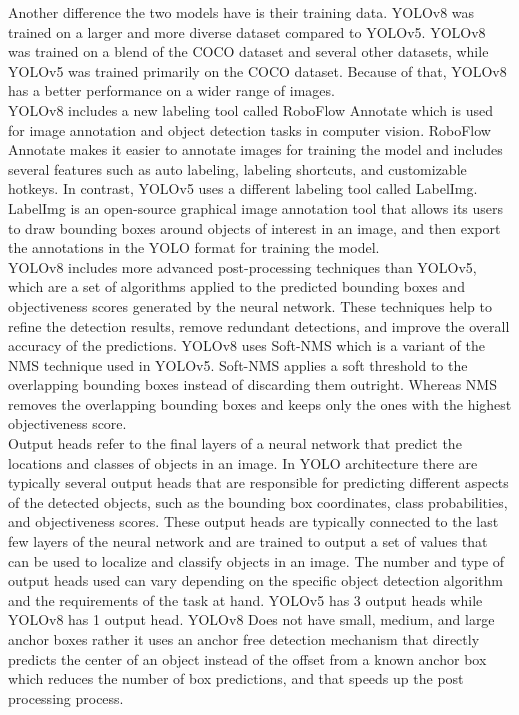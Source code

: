 \documentclass[10pt,twocolumn,letterpaper]{article}
\begin{document}
Another difference the two models have is their training data. YOLOv8 was trained on a larger and more diverse dataset compared to YOLOv5. YOLOv8 was trained on a blend of the COCO dataset and several other datasets, while YOLOv5 was trained primarily on the COCO dataset. Because of that, YOLOv8 has a better performance on a wider range of images.\\
YOLOv8 includes a new labeling tool called RoboFlow Annotate which is used for image annotation and object detection tasks in computer vision. RoboFlow Annotate makes it easier to annotate images for training the model and includes several features such as auto labeling, labeling shortcuts, and customizable hotkeys. In contrast, YOLOv5 uses a different labeling tool called LabelImg. LabelImg is an open-source graphical image annotation tool that allows its users to draw bounding boxes around objects of interest in an image, and then export the annotations in the YOLO format for training the model.\\
YOLOv8 includes more advanced post-processing techniques than YOLOv5, which are a set of algorithms applied to the predicted bounding boxes and objectiveness scores generated by the neural network. These techniques help to refine the detection results, remove redundant detections, and improve the overall accuracy of the predictions. YOLOv8 uses Soft-NMS which is a variant of the NMS technique used in YOLOv5. Soft-NMS applies a soft threshold to the overlapping bounding boxes instead of discarding them outright. Whereas NMS removes the overlapping bounding boxes and keeps only the ones with the highest objectiveness score.\\		
Output heads refer to the final layers of a neural network that predict the locations and classes of objects in an image. In YOLO architecture there are typically several output heads that are responsible for predicting different aspects of the detected objects, such as the bounding box coordinates, class probabilities, and objectiveness scores. These output heads are typically connected to the last few layers of the neural network and are trained to output a set of values that can be used to localize and classify objects in an image. The number and type of output heads used can vary depending on the specific object detection algorithm and the requirements of the task at hand. YOLOv5 has 3 output heads while YOLOv8 has 1 output head. YOLOv8 Does not have small, medium, and large anchor boxes rather it uses an anchor free detection mechanism that directly predicts the center of an object instead of the offset from a known anchor box which reduces the number of box predictions, and that speeds up the post processing process.\\
\end{document}
